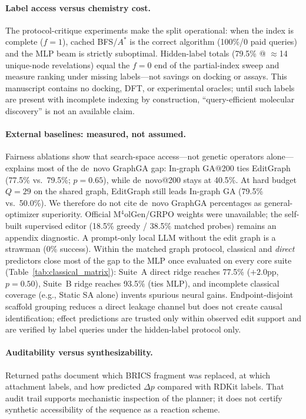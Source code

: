 \paragraph{Label access versus chemistry cost.}
The protocol-critique experiments make the split operational: when the index is complete ($f{=}1$), cached BFS/$A^\ast$ is the correct algorithm (100\%/0 paid queries) and the MLP beam is strictly suboptimal. Hidden-label totals (79.5\% @ $\approx$14 unique-node revelations) equal the $f{=}0$ end of the partial-index sweep and measure ranking under missing labels---not savings on docking or assays. This manuscript contains no docking, DFT, or experimental oracles; until such labels are present with incomplete indexing by construction, ``query-efficient molecular discovery'' is not an available claim.

\paragraph{External baselines: measured, not assumed.}
Fairness ablations show that search-space access---not genetic operators alone---explains most of the de~novo GraphGA gap: In-graph GA@200 ties EditGraph (77.5\% vs.\ 79.5\%; $p{=}0.65$), while de~novo@200 stays at 40.5\%. At hard budget $Q{=}29$ on the shared graph, EditGraph still leads In-graph GA (79.5\% vs.\ 50.0\%). We therefore do not cite de~novo GraphGA percentages as general-optimizer superiority. Official M$^4$olGen/GRPO weights were unavailable; the self-built supervised editor (18.5\% greedy / 38.5\% matched probes) remains an appendix diagnostic. A prompt-only local LLM without the edit graph is a strawman (0\% success). Within the matched graph protocol, classical and \emph{direct} predictors close most of the gap to the MLP once evaluated on every core suite (Table~\ref{tab:classical_matrix}): Suite~A direct ridge reaches 77.5\% ($+2.0$pp, $p{=}0.50$), Suite~B ridge reaches 93.5\% (ties MLP), and incomplete classical coverage (e.g., Static SA alone) invents spurious neural gains. Endpoint-disjoint scaffold grouping reduces a direct leakage channel but does not create causal identification; effect predictions are trusted only within observed edit support and are verified by label queries under the hidden-label protocol only.

\paragraph{Auditability versus synthesizability.}
Returned paths document which BRICS fragment was replaced, at which attachment labels, and how predicted $\Delta p$ compared with RDKit labels. That audit trail supports mechanistic inspection of the planner; it does not certify synthetic accessibility of the sequence as a reaction scheme.


